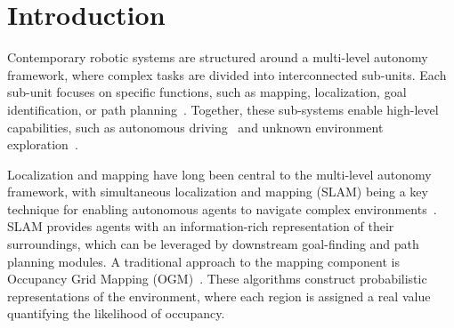 \section{Introduction}
\label{sec:introduction}


\noindent
Contemporary robotic systems are structured around a multi-level autonomy framework, where complex tasks are divided into interconnected sub-units. Each sub-unit focuses on specific functions, such as mapping, localization, goal identification, or path planning~\cite{robotics13010012}. Together, these sub-systems enable high-level capabilities, such as autonomous driving~\cite{REDA2024104630} and unknown environment exploration~\cite{zhao2024exploration}.

Localization and mapping have long been central to the multi-level autonomy framework, with simultaneous localization and mapping (SLAM) being a key technique for enabling autonomous agents to navigate complex environments~\cite{macario2022comprehensive}. SLAM provides agents with an information-rich representation of their surroundings, which can be leveraged by downstream goal-finding and path planning modules.
A traditional approach to the mapping component is Occupancy Grid Mapping (OGM)~\cite{elfes1989using}. These algorithms construct probabilistic representations of the environment, where each region is assigned a real value quantifying the likelihood of occupancy.

